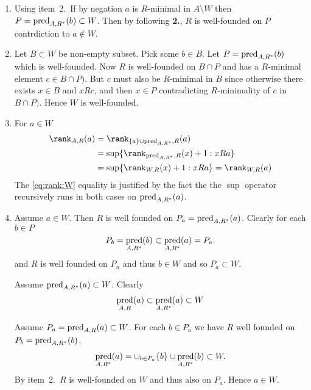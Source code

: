 \begin{enumerate}
  \item
    Using item~2.\ If by negation $a$ is $R$-minimal in \(A \setminus W\)
    then \(P=\mathop{\mathrm{pred}}_{A,R^*}(b) \subset W\).
    Then by following \textbf{2.}, $R$ is well-founded on $P$
    contrdiction to \(a\notin W\).
  
  \item
    Let \(B \subset W\) be non-empty subset.
    Pick some \(b\in B\). Let \(P = \mathop{\mathrm{pred}}_{A,R^*}(b)\) which is well-founded.
    Now $R$ is well-founded on \(B \cap P\) and has a $R$-minimal
    element \(c \in B \cap P)\). But $c$ must also be $R$-minimal in $B$
    since otherwise there exists \(x\in B\) and \(xRc\), and then \(x\in P\)
    contradicting $R$-minimality of $c$ in \(B \cap P)\).
    Hence $W$ is well-founded.

  \item
    For \(a\in W\)
    \begin{align}
      \rank_{A,R}(a) &= \rank_{\{a\}\cup\pred_{A,R^*},R}(a) \nonumber \\
      &= \sup\{\rank_{\pred_{A,R^*},R}(x) + 1: xRa\} \nonumber \\
      &= \sup\{\rank_{W,R}(x) + 1: xRa\} = \rank_{W,R}(a) \label{eq:rank:W}
    \end{align}
    The \eqref{eq:rank:W} equality
    is justified by the fact the the \(\sup\) operator
    recursively runs in both cases on \(\mathop{\mathrm{pred}}_{A,R^*}(a)\).

  \item
    Assume \(a \in W\). Then $R$ is well founded on \(P_a=\mathop{\mathrm{pred}}_{A,R^*}(a)\).
    Clearly for each \(b\in P\)
    \begin{equation*}
      P_b = \mathop{\mathrm{pred}}_{A,R^*}(b) \subset \mathop{\mathrm{pred}}_{A,R^*}(a) = P_a.
    \end{equation*}
    and  $R$ is well founded on \(P_n\) and thus \(b\in W\)
    and so \(P_a\subset W\).

    Assume \(\mathop{\mathrm{pred}}_{A,R^*}(a) \subset W\). Clearly
    \begin{equation*}
      \mathop{\mathrm{pred}}_{A,R}(a) \subset \mathop{\mathrm{pred}}_{A,R^*}(a) \subset W
    \end{equation*}

    Assume \(P_a = \mathop{\mathrm{pred}}_{A,R}(a) \subset W\).
    For each \(b \in P_a\) we have $R$ well founded on\(P_b = \mathop{\mathrm{pred}}_{A,R^*}(b)\).
    \begin{align*}
       \mathop{\mathrm{pred}}_{A,R^*}(a) = \cup_{b\in P_a} \{b\} \cup \mathop{\mathrm{pred}}_{A,R^*}(b) \subset W.
    \end{align*}
    By item~2.\ $R$ is well-founded on $W$ and thus also on \(P_a\).
    Hence \(a\in W\).
\end{enumerate}

